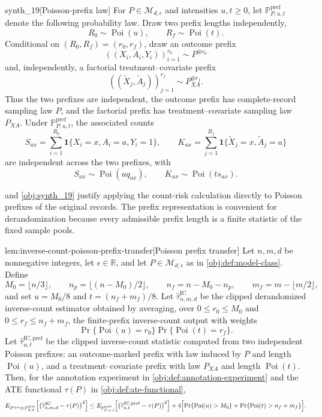 \documentclass[11pt]{article}
\begin{document}
\begin{definitionv}{synth_19}[Poisson-prefix law]
For \(P\in\mathcal M_{d,\epsilon}\) and intensities \(u,t\ge0\), let \(\mathbb P^{\mathrm{pref}}_{P,u,t}\) denote the following probability law. Draw two prefix lengths independently,
\[
R_0\sim \operatorname{Poi}(u),\qquad R_f\sim \operatorname{Poi}(t).
\]
Conditional on \((R_0,R_f)=(r_0,r_f)\), draw an outcome prefix
\[
((X_i,A_i,Y_i))_{i=1}^{r_0}\sim P^{\otimes r_0}
\]
and, independently, a factorial treatment--covariate prefix
\[
((\widetilde X_j,\widetilde A_j))_{j=1}^{r_f}\sim P_{XA}^{\otimes r_f}.
\]
Thus the two prefixes are independent, the outcome prefix has complete-record sampling law \(P\), and the factorial prefix has treatment--covariate sampling law \(P_{XA}\). Under \(\mathbb P^{\mathrm{pref}}_{P,u,t}\), the associated counts
\[
S_{ax}=\sum_{i=1}^{R_0}\mathbf 1\{X_i=x,A_i=a,Y_i=1\},
\qquad
K_{ax}=\sum_{j=1}^{R_f}\mathbf 1\{\widetilde X_j=x,\widetilde A_j=a\}
\]
are independent across the two prefixes, with
\[
S_{ax}\sim\operatorname{Poi}(u q_{ax}),\qquad
K_{ax}\sim\operatorname{Poi}(t s_{ax}).
\]
\end{definitionv}

 and \cref{obj:synth_19} justify applying the count-risk calculation directly to Poisson prefixes of the original records. The prefix representation is convenient for derandomization because every admissible prefix length is a finite statistic of the fixed sample pools.

\begin{lemmav}{lem:inverse-count-poisson-prefix-transfer}[Poisson prefix transfer]
Let \(n,m,d\) be nonnegative integers, let \(\epsilon\in\mathbb R\), and let \(P\in\mathcal M_{d,\epsilon}\) as in \cref{obj:def:model-class}.  Define
\[
M_0=\bigl\lfloor n/3\bigr\rfloor,\qquad
n_p=\bigl\lfloor (n-M_0)/2\bigr\rfloor,\qquad
n_f=n-M_0-n_p,\qquad
m_f=m-\bigl\lfloor m/2\bigr\rfloor,
\]
and set \(u=M_0/8\) and \(t=(n_f+m_f)/8\).  Let \(\widehat\tau^{\mathrm{IC}}_{n,m,d}\) be the clipped derandomized inverse-count estimator obtained by averaging, over \(0\le r_0\le M_0\) and \(0\le r_f\le n_f+m_f\), the finite-prefix inverse-count output with weights
\[
\Pr\{\operatorname{Poi}(u)=r_0\}\Pr\{\operatorname{Poi}(t)=r_f\}.
\]
Let \(\widehat\tau^{\mathrm{IC,pref}}_{u,t}\) be the clipped inverse-count statistic computed from two independent Poisson prefixes: an outcome-marked prefix with law induced by \(P\) and length \(\operatorname{Poi}(u)\), and a treatment--covariate prefix with law \(P_{XA}\) and length \(\operatorname{Poi}(t)\).  Then, for the annotation experiment in \cref{obj:def:annotation-experiment} and the ATE functional \(\tau(P)\) in \cref{obj:def:ate-functional},
\[
E_{P^{\otimes n}\otimes P_{XA}^{\otimes m}}
\!\left[
  \bigl(\widehat\tau^{\mathrm{IC}}_{n,m,d}-\tau(P)\bigr)^2
\right]
\le
E_{\mathbb P^{\mathrm{pref}}_{P,u,t}}
\!\left[
  \bigl(\widehat\tau^{\mathrm{IC,pref}}_{u,t}-\tau(P)\bigr)^2
\right]
+4\Bigl[
  \Pr\{\operatorname{Poi}(u)>M_0\}
  +\Pr\{\operatorname{Poi}(t)>n_f+m_f\}
\Bigr].
\]
\end{lemmav}
\end{document}
